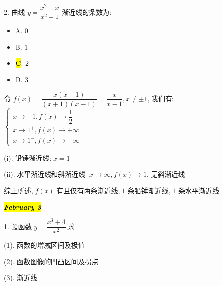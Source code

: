 2. 曲线 $y=\dfrac{x^{2}+x}{x^{2}-1}$ 渐近线的条数为:
\begin{itemize}
	\item A. $0$
	\item B. $1$
	\item \hl{\textbf{C}}. $2$
	\item D. $3$
\end{itemize}
\begin{solution}

	令 $f(x) = \dfrac{x(x+1)}{(x+1)(x-1)}=\dfrac{x}{x-1},x\neq \pm 1$, 我们有: 
	$\begin{cases}
	x\to -1, f(x)\to \dfrac{1}{2}\\
	x\to 1^{+}, f(x)\to +\infty\\
	x\to 1^{-}, f(x)\to -\infty
	\end{cases}$

	(i). 铅锤渐近线: $x = 1$

	(ii). 水平渐近线和斜渐近线: $x\to \infty, f(x)\to 1$, 无斜渐近线

	综上所述, $f(x)$ 有且仅有两条渐近线, $1$ 条铅锤渐近线, $1$ 条水平渐近线
\end{solution}

\hl{\textbf{\textit{February 3}}}

1. 设函数 $y=\dfrac{x^{3}+4}{x^{2}}$,求

(1). 函数的增减区间及极值

(2). 函数图像的凹凸区间及拐点

(3). 渐近线


